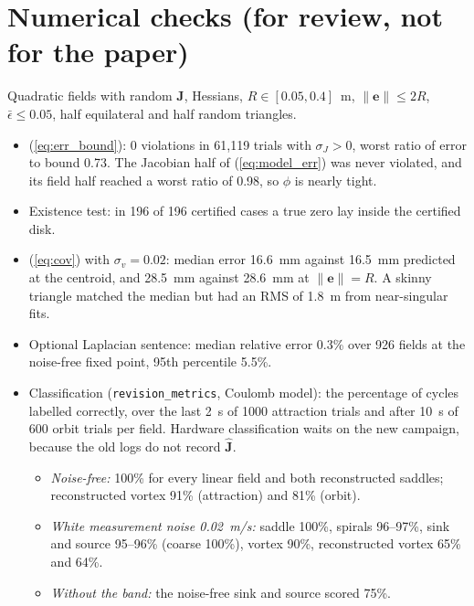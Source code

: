 \documentclass[10pt]{article}
\begin{document}
\section*{Numerical checks (for review, not for the paper)}
Quadratic fields with random $\mathbf{J}$, Hessians, $R \in [0.05, 0.4]$~m, $\|\mathbf{e}\| \le 2R$, $\bar{\epsilon} \le 0.05$, half equilateral and half random triangles.
\begin{itemize}
\item (\ref{eq:err_bound}): 0 violations in 61{,}119 trials with $\sigma_J > 0$, worst ratio of error to bound 0.73. The Jacobian half of (\ref{eq:model_err}) was never violated, and its field half reached a worst ratio of 0.98, so $\phi$ is nearly tight.
\item Existence test: in 196 of 196 certified cases a true zero lay inside the certified disk.
\item (\ref{eq:cov}) with $\sigma_v = 0.02$: median error 16.6~mm against 16.5~mm predicted at the centroid, and 28.5~mm against 28.6~mm at $\|\mathbf{e}\| = R$. A skinny triangle matched the median but had an RMS of 1.8~m from near-singular fits.
\item Optional Laplacian sentence: median relative error 0.3\% over 926 fields at the noise-free fixed point, 95th percentile 5.5\%.
\item Classification (\texttt{revision\_metrics}, Coulomb model): the percentage of cycles labelled correctly, over the last 2~s of 1000 attraction trials and after 10~s of 600 orbit trials per field. Hardware classification waits on the new campaign, because the old logs do not record $\hat{\mathbf{J}}$.
\begin{itemize}
\item \emph{Noise-free:} 100\% for every linear field and both reconstructed saddles; reconstructed vortex 91\% (attraction) and 81\% (orbit).
\item \emph{White measurement noise 0.02~m/s:} saddle 100\%, spirals 96--97\%, sink and source 95--96\% (coarse 100\%), vortex 90\%, reconstructed vortex 65\% and 64\%.
\item \emph{Without the band:} the noise-free sink and source scored 75\%.
\end{itemize}
\end{itemize}
\end{document}
